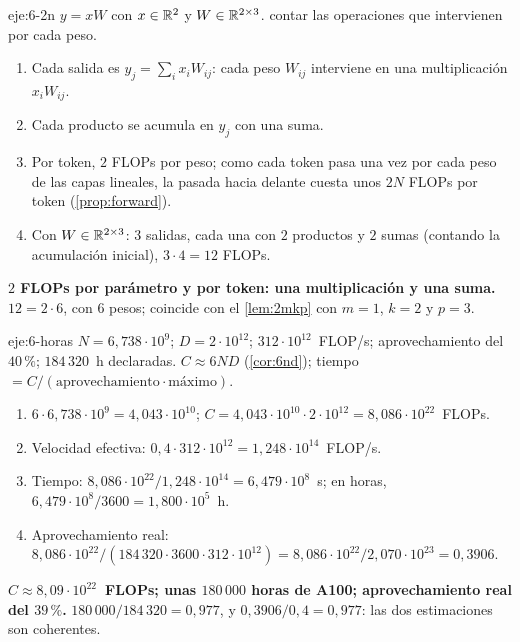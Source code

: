 \begin{solucion}{eje:6-2n}
\datos $y=xW$ con $x\in\mathbb{R}^{2}$ y $W\in\mathbb{R}^{2\times 3}$.
\planteamiento contar las operaciones que intervienen por cada peso.
\pasos
\begin{enumerate}[label=\arabic*.]
  \item Cada salida es $y_j=\sum_i x_iW_{ij}$: cada peso $W_{ij}$ interviene en una multiplicación $x_iW_{ij}$.
  \item Cada producto se acumula en $y_j$ con una suma.
  \item Por token, $2$ FLOPs por peso; como cada token pasa una vez por cada peso de las capas lineales, la pasada hacia delante cuesta unos $2N$ FLOPs por token (\cref{prop:forward}).
  \item Con $W\in\mathbb{R}^{2\times 3}$: $3$ salidas, cada una con $2$ productos y $2$ sumas (contando la acumulación inicial), $3\cdot 4=12$ FLOPs.
\end{enumerate}
\resultado \textbf{$2$ FLOPs por parámetro y por token: una multiplicación y una suma.}
\comprobacion $12=2\cdot 6$, con $6$ pesos; coincide con el \cref{lem:2mkp} con $m=1$, $k=2$ y $p=3$.
\end{solucion}

\begin{solucion}{eje:6-horas}
\datos $N=6{,}738\cdot 10^{9}$; $D=2\cdot 10^{12}$; $312\cdot 10^{12}$~FLOP/s; aprovechamiento del $40\,\%$; $184\,320$~h declaradas.
\planteamiento $C\approx 6ND$ (\cref{cor:6nd}); tiempo $=C/(\text{aprovechamiento}\cdot\text{máximo})$.
\pasos
\begin{enumerate}[label=\arabic*.]
  \item $6\cdot 6{,}738\cdot 10^{9}=4{,}043\cdot 10^{10}$; $C=4{,}043\cdot 10^{10}\cdot 2\cdot 10^{12}=8{,}086\cdot 10^{22}$~FLOPs.
  \item Velocidad efectiva: $0{,}4\cdot 312\cdot 10^{12}=1{,}248\cdot 10^{14}$~FLOP/s.
  \item Tiempo: $8{,}086\cdot 10^{22}/1{,}248\cdot 10^{14}=6{,}479\cdot 10^{8}$~s; en horas, $6{,}479\cdot 10^{8}/3600=1{,}800\cdot 10^{5}$~h.
  \item Aprovechamiento real: $8{,}086\cdot 10^{22}/(184\,320\cdot 3600\cdot 312\cdot 10^{12})=8{,}086\cdot 10^{22}/2{,}070\cdot 10^{23}=0{,}3906$.
\end{enumerate}
\resultado \textbf{$C\approx 8{,}09\cdot 10^{22}$~FLOPs; unas $180\,000$ horas de A100; aprovechamiento real del $39\,\%$.}
\comprobacion $180\,000/184\,320=0{,}977$, y $0{,}3906/0{,}4=0{,}977$: las dos estimaciones son coherentes.
\end{solucion}

